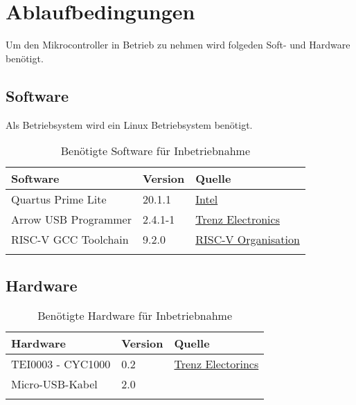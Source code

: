 \chapter{Ablaufbedingungen}
    Um den Mikrocontroller in Betrieb zu nehmen wird folgeden Soft- und Hardware benötigt.
   

    \section{Software}
        Als Betriebsystem wird ein Linux Betriebsystem benötigt.
        \begin{center}
            \begin{longtable}{| l | l | l |}
                \hline
                    Software & Version & Quelle \\
                \hline
                    Quartus Prime Lite & 20.1.1 & \href{https://fpgasoftware.intel.com/?edition=lite}{Intel}\\
                \hline
                    Arrow USB Programmer & 2.4.1-1 & \href{https://wiki.trenz-electronic.de/display/PD/Arrow+USB+Programmer#ArrowUSBProgrammer-DownloadSetupFiles}{Trenz Electronics}\\
                \hline
                    RISC-V GCC Toolchain & 9.2.0 & \href{https://github.com/riscv/riscv-gnu-toolchain}{RISC-V Organisation}\\
                \hline
                \caption{Benötigte Software für Inbetriebnahme}
            \end{longtable}
        \end{center}

    \section{Hardware}
        \begin{center}
            \begin{longtable}{| l | l | l |}
                \hline
                    Hardware & Version & Quelle \\
                \hline
                    TEI0003 - CYC1000 & 0.2 & \href{https://wiki.trenz-electronic.de/display/PD/TEI0003+Getting+Started}{Trenz Electorincs}\\
                \hline
                    Micro-USB-Kabel & 2.0 & \\
                \hline
                \caption{Benötigte Hardware für Inbetriebnahme}
            \end{longtable}
        \end{center}